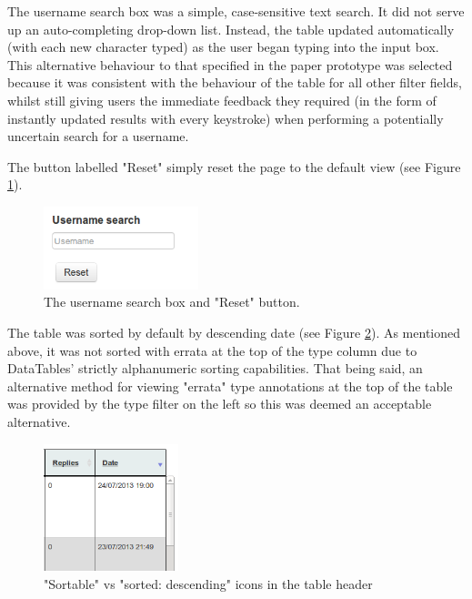 The username search box was a simple, case-sensitive text search. It did not serve up an auto-completing drop-down list. Instead, the table updated automatically (with each new character typed) as the user began typing into the input box. This alternative behaviour to that specified in the paper prototype was selected because it was consistent \citep[p. 261]{DixFinlay} with the behaviour of the table for all other filter fields, whilst still giving users the immediate feedback they required (in the form of instantly updated results with every keystroke) when performing a potentially uncertain search for a username. 

The button labelled "Reset" simply reset the page to the default view (see Figure \ref{fig:reset}). 
\begin{figure}[h!]
    \centering
    \includegraphics[width=0.4\textwidth]{Figures/V1/usernameReset.png}
 \caption{The username search box and "Reset" button.}
 \label{fig:reset}

\end{figure}

The table was sorted by default by descending date (see Figure \ref{fig:sort}).  As mentioned above, it was not sorted with errata at the top of  the type column due to DataTables' strictly alphanumeric sorting capabilities. That being said, an alternative method for viewing "errata" type annotations at the top of the table was provided by the type filter on the left so this was deemed an acceptable alternative. 
\begin{figure}[h!]
    \centering
    \includegraphics[width=0.35\textwidth]{Figures/V1/sorticons.png}
 \caption{"Sortable" vs "sorted: descending" icons in the table header}
 \label{fig:sort}

\end{figure}	

